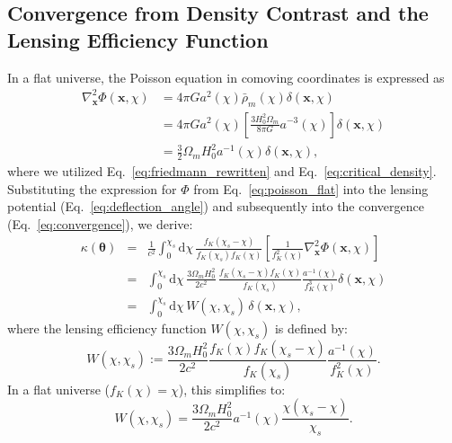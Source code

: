 \subsection[Convergence from Density Contrast]{Convergence from Density Contrast and the Lensing Efficiency Function}
In a flat universe, the Poisson equation in comoving coordinates is expressed as
\begin{align}
\label{eq:poisson_flat}
    \nabla_{\mathbf{x}}^2 \Phi(\mathbf{x}, \chi) &= 4\pi G a^2(\chi) \bar{\rho}_m(\chi) \delta(\mathbf{x}, \chi) \nonumber\\ 
    &= 4\pi G a^2(\chi) \left[ \frac{3 H_0^2 \Omega_m}{8 \pi G} a^{-3}(\chi) \right] \delta(\mathbf{x}, \chi) \nonumber \\ 
    &= \frac{3}{2} \Omega_m H_0^2 a^{-1}(\chi) \delta(\mathbf{x}, \chi),
\end{align}
where we utilized Eq.~\eqref{eq:friedmann_rewritten} and Eq.~\eqref{eq:critical_density}.
Substituting the expression for $\Phi$ from Eq.~\eqref{eq:poisson_flat} into the lensing potential (Eq.~\eqref{eq:deflection_angle}) and subsequently into the convergence (Eq.~\eqref{eq:convergence}), we derive:
\begin{eqnarray}
    \label{eq:convergence_integral}
    \kappa(\boldsymbol{\theta}) 
    &=& \frac{1}{c^2} \int_0^{\chi_s} \mathrm{d}\chi \, \frac{f_K(\chi_s - \chi)}{f_K(\chi_s) f_K(\chi)} \left[ \frac{1}{f_K^2(\chi)} \nabla_{\mathbf{x}}^2 \Phi\left(\mathbf{x}, \chi\right) \right] \nonumber \\
    &=& \int_0^{\chi_s} \mathrm{d}\chi \, \frac{3 \Omega_m H_0^2}{2 c^2} \, \frac{f_K(\chi_s - \chi) f_K(\chi)}{f_K(\chi_s)} \frac{a^{-1}(\chi)}{f_K^3(\chi)} \delta\left(\mathbf{x}, \chi\right) \nonumber \\
    &=& \int_0^{\chi_s} \mathrm{d}\chi \, W(\chi, \chi_s) \, \delta\left(\mathbf{x}, \chi\right),
\end{eqnarray}
where the lensing efficiency function $W(\chi, \chi_s)$ is defined by:
\begin{equation}
    \label{eq:lensing_efficiency}
    W(\chi, \chi_s) := \frac{3 \Omega_m H_0^2}{2 c^2} \frac{f_K(\chi) f_K(\chi_s - \chi)}{f_K(\chi_s)} \frac{a^{-1}(\chi)}{f_K^2(\chi)}.
\end{equation}
In a flat universe ($f_K(\chi) = \chi$), this simplifies to:
\begin{equation}
    \label{eq:lensing_efficiency_flat}
    W(\chi, \chi_s) = \frac{3 \Omega_m H_0^2}{2 c^2} a^{-1}(\chi) \frac{\chi (\chi_s - \chi)}{\chi_s}.
\end{equation}

